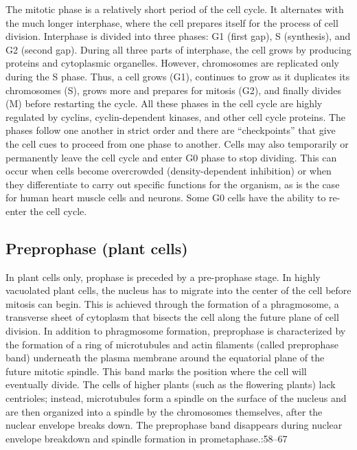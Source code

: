 The mitotic phase is a relatively short period of the cell cycle. It alternates with the much longer interphase, where the cell prepares itself for the process of cell division. Interphase is divided into three phases: G1 (first gap), S (synthesis), and G2 (second gap). During all three parts of interphase, the cell grows by producing proteins and cytoplasmic organelles. However, chromosomes are replicated only during the S phase. Thus, a cell grows (G1), continues to grow as it duplicates its chromosomes (S), grows more and prepares for mitosis (G2), and finally divides (M) before restarting the cycle. All these phases in the cell cycle are highly regulated by cyclins, cyclin-dependent kinases, and other cell cycle proteins. The phases follow one another in strict order and there are ``checkpoints'' that give the cell cues to proceed from one phase to another. Cells may also temporarily or permanently leave the cell cycle and enter G0 phase to stop dividing. This can occur when cells become overcrowded (density-dependent inhibition) or when they differentiate to carry out specific functions for the organism, as is the case for human heart muscle cells and neurons. Some G0 cells have the ability to re-enter the cell cycle.

\hypertarget{preprophase-plant-cells}{%
\subsection{Preprophase (plant cells)}\label{preprophase-plant-cells}}

In plant cells only, prophase is preceded by a pre-prophase stage. In highly vacuolated plant cells, the nucleus has to migrate into the center of the cell before mitosis can begin. This is achieved through the formation of a phragmosome, a transverse sheet of cytoplasm that bisects the cell along the future plane of cell division. In addition to phragmosome formation, preprophase is characterized by the formation of a ring of microtubules and actin filaments (called preprophase band) underneath the plasma membrane around the equatorial plane of the future mitotic spindle. This band marks the position where the cell will eventually divide. The cells of higher plants (such as the flowering plants) lack centrioles; instead, microtubules form a spindle on the surface of the nucleus and are then organized into a spindle by the chromosomes themselves, after the nuclear envelope breaks down. The preprophase band disappears during nuclear envelope breakdown and spindle formation in prometaphase.:58--67

